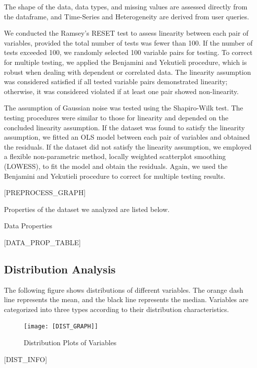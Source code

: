 \documentclass{article}
\begin{document}
The shape of the data, data types, and missing values are assessed directly from the dataframe, and Time-Series and Heterogeneity are derived from user queries.

We conducted the Ramsey's RESET test to assess linearity between each pair of variables, provided the total number of tests was fewer than 100. If the number of tests exceeded 100, we randomly selected 100 variable pairs for testing.
To correct for multiple testing, we applied the Benjamini and Yekutieli procedure, which is robust when dealing with dependent or correlated data. 
The linearity assumption was considered satisfied if all tested variable pairs demonstrated linearity; otherwise, it was considered violated if at least one pair showed non-linearity.

The assumption of Gaussian noise was tested using the Shapiro-Wilk test. The testing procedures were similar to those for linearity and depended on the concluded linearity assumption. 
If the dataset was found to satisfy the linearity assumption, we fitted an OLS model between each pair of variables and obtained the residuals. 
If the dataset did not satisfy the linearity assumption, we employed a flexible non-parametric method, locally weighted scatterplot smoothing (LOWESS), to fit the model and obtain the residuals. 
Again, we used the Benjamini and Yekutieli procedure to correct for multiple testing results. 


[PREPROCESS_GRAPH]

Properties of the dataset we analyzed are listed below.

\begin{table}[H]
    \centering
    \caption{Data Properties}
[DATA_PROP_TABLE]
\end{table}


\subsection{Distribution Analysis}
The following figure shows distributions of different variables. The orange dash line represents the mean, 
and the black line represents the median. Variables are categorized into three types according to their distribution characteristics.

\begin{figure}[H]
\centering
\texttt{[image: [DIST\_GRAPH]]}
\caption{\label{fig:dist}Distribution Plots of Variables}
\end{figure}

[DIST_INFO]
\end{document}
